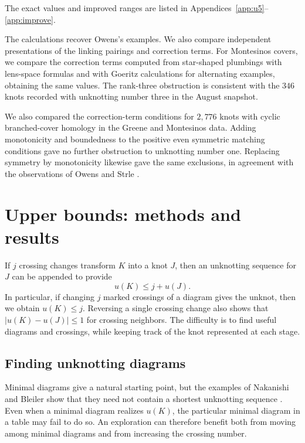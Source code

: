 \documentclass[12pt, oneside]{amsart}
\begin{document}
The exact values and improved ranges are listed in Appendices~\ref{app:u5}--\ref{app:improve}.

The calculations recover Owens's examples. We also compare independent presentations
of the linking pairings and correction terms. For Montesinos covers, we compare
the correction terms computed from star-shaped plumbings with lens-space
formulas and with Goeritz calculations for alternating examples, obtaining the
same values. The rank-three obstruction is consistent with the $346$ knots
recorded with unknotting number three in the August snapshot.

We also compared the correction-term conditions for $2{,}776$ knots with cyclic
branched-cover homology in the Greene and Montesinos data. Adding monotonicity
and boundedness to the positive even symmetric matching conditions gave no
further obstruction to unknotting number one. Replacing symmetry by monotonicity
likewise gave the same exclusions, in agreement with the observations of Owens
and Strle \cite[Thm.~3 and the subsequent discussion]{OwensStrle}.


\flushbottom
\section{Upper bounds: methods and results}\label{sec:upper}

If $j$ crossing changes transform $K$ into a knot $J$,
then an unknotting sequence for $J$ can be appended to provide
\begin{equation}\label{eq:upper}
    u(K)\le j+u(J).
\end{equation}
In particular, if changing $j$ marked crossings of a diagram gives the unknot,
then we obtain $u(K)\le j$. Reversing a single crossing change also shows that
$|u(K)-u(J)|\le1$ for crossing neighbors. The difficulty is to find useful diagrams and
crossings, while keeping track of the knot represented at each stage.

\subsection{Finding unknotting diagrams}

Minimal diagrams give a natural starting point, but the examples of Nakanishi and Bleiler
show that they need not contain a shortest unknotting sequence \cite{Nakanishi,Bleiler}.
Even when a minimal diagram realizes $u(K)$, the particular minimal diagram in a table
may fail to do so. An exploration can therefore benefit both from moving among minimal diagrams
and from increasing the crossing number.
\end{document}
